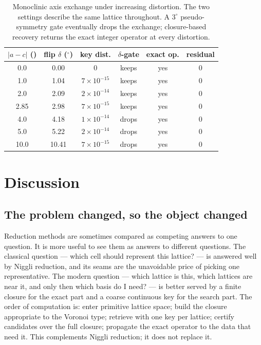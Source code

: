 \documentclass[11pt]{article}
\newcommand{\Ang}{\text{\AA}}
\begin{document}
\begin{table}[t]
\centering
\caption{Monoclinic axis exchange under increasing distortion. The two settings describe the same lattice throughout. A $3^\circ$ pseudo-symmetry gate eventually drops the exchange; closure-based recovery returns the exact integer operator at every distortion.}
\label{tab:flip}
\begin{tabular}{cccccc}
\toprule
$|a-c|$ (\Ang) & flip $\delta$ ($^\circ$) & key dist. & $\delta$-gate & exact op. & residual \\
\midrule
0.0  & 0.00  & $0$ & keeps & yes & $0$ \\
1.0  & 1.04  & $7\times10^{-15}$ & keeps & yes & $0$ \\
2.0  & 2.09  & $2\times10^{-14}$ & keeps & yes & $0$ \\
2.85 & 2.98  & $7\times10^{-15}$ & keeps & yes & $0$ \\
4.0  & 4.18  & $1\times10^{-14}$ & drops & yes & $0$ \\
5.0  & 5.22  & $2\times10^{-14}$ & drops & yes & $0$ \\
10.0 & 10.41 & $7\times10^{-15}$ & drops & yes & $0$ \\
\bottomrule
\end{tabular}
\end{table}

\section{Discussion}

\subsection{The problem changed, so the object changed}

Reduction methods are sometimes compared as competing answers to one question. It is more useful to see them as answers to different questions. The classical question --- which cell should represent this lattice? --- is answered well by Niggli reduction, and its seams are the unavoidable price of picking one representative. The modern question --- which lattice is this, which lattices are near it, and only then which basis do I need? --- is better served by a finite closure for the exact part and a coarse continuous key for the search part. The order of computation is: enter primitive lattice space; build the closure appropriate to the Voronoi type; retrieve with one key per lattice; certify candidates over the full closure; propagate the exact operator to the data that need it. This complements Niggli reduction; it does not replace it.
\end{document}
